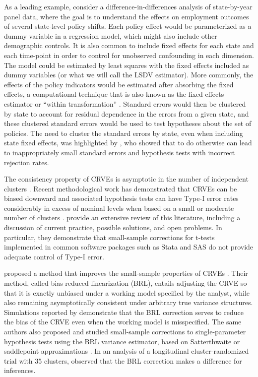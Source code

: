 \documentclass[12pt]{article}\usepackage[]{graphicx}\usepackage[]{color}
\begin{document}
As a leading example, consider a difference-in-differences analysis of state-by-year panel data, where the goal is to understand the effects on employment outcomes of several state-level policy shifts. 
Each policy effect would be parameterized as a dummy variable in a regression model, which might also include other demographic controls. It is also common to include fixed effects for each state and each time-point in order to control for unobserved confounding in each dimension. 
The model could be estimated by least squares with the fixed effects included as dummy variables (or what we will call the LSDV estimator). More commonly, the effects of the policy indicators would be estimated after absorbing the fixed effects, a computational technique that is also known as the fixed effects estimator or ``within transformation'' \citep{Wooldridge2010econometric}. 
Standard errors would then be clustered by state to account for residual dependence in the errors from a given state, and these clustered standard errors would be used to test hypotheses about the set of policies.
The need to cluster the standard errors by state, even when including state fixed effects, was highlighted by \citet{Bertrand2004how}, who showed that to do otherwise can lead to inappropriately small standard errors and hypothesis tests with incorrect rejection rates. 

The consistency property of CRVEs is asymptotic in the number of independent clusters \citep{Wooldridge2003cluster}.
Recent methodological work has demonstrated that CRVEs can be biased downward and associated hypothesis tests can have Type-I error rates considerably in excess of nominal levels when based on a small or moderate number of clusters \citep[e.g.,][]{Webb2013wild}.
\citet{Cameron2015practitioners} provide an extensive review of this literature, including a discussion of current practice, possible solutions, and open problems. 
In particular, they demonstrate that small-sample corrections for t-tests implemented in common software packages such as Stata and SAS do not provide adequate control of Type-I error. 

\citet{Bell2002bias} proposed a method that improves the small-sample properties of CRVEs \citep[see also][]{McCaffrey2001generalizations}. 
Their method, called bias-reduced linearization (BRL), entails adjusting the CRVE so that it is exactly unbiased under a working model specified by the analyst, while also remaining asymptotically consistent under arbitrary true variance structures. 
Simulations reported by \citet{Bell2002bias} demonstrate that the BRL correction serves to reduce the bias of the CRVE even when the working model is misspecified. 
The same authors also proposed and studied small-sample corrections to single-parameter hypothesis tests using the BRL variance estimator, based on Satterthwaite \citep{Bell2002bias} or saddlepoint approximations \citep{McCaffrey2006improved}. 
In an analysis of a longitudinal cluster-randomized trial with 35 clusters, \citet{Angrist2009effects} observed that the BRL correction makes a difference for inferences. 
\end{document}
